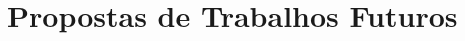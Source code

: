 	\chapter{Propostas de Trabalhos Futuros}

	\
	

	\begin{apendicesenv}
	\partapendices
\end{apendicesenv}

	\begin{anexosenv}
	\partanexos
\end{anexosenv}


